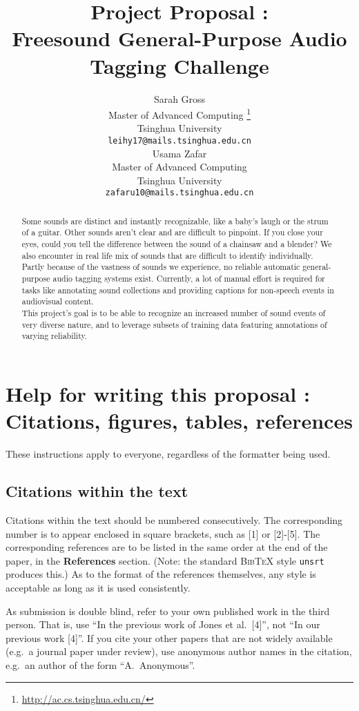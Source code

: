 \documentclass{article} %
\title{Project Proposal : \\Freesound General-Purpose Audio Tagging Challenge}
\author{
Sarah Gross \\
Master of Advanced Computing \thanks{\url{http://ac.cs.tsinghua.edu.cn/}}\\
Tsinghua University\\
\texttt{leihy17@mails.tsinghua.edu.cn} \\
\And
Usama Zafar\\
Master of Advanced Computing\\
Tsinghua University\\
\texttt{zafaru10@mails.tsinghua.edu.cn} \\
}
\begin{document}
\maketitle

\begin{abstract}
	Some sounds are distinct and instantly recognizable, like a baby's laugh or the strum of a guitar. Other sounds aren't clear and are difficult to pinpoint. 
	If you close your eyes, could you tell the difference between the sound of a chainsaw and a blender? We also encounter in real life mix of sounds that are difficult to identify individually.\\
	Partly because of the vastness of sounds we experience, no reliable automatic general-purpose audio tagging systems exist. Currently, a lot of manual effort is required for tasks like annotating sound collections and providing captions for non-speech events in audiovisual content.\\
	This project's goal is to be able to recognize an increased number of sound events of very diverse nature, and to leverage subsets of training data featuring annotations of varying reliability.
\end{abstract}

\section{Help for writing this proposal : Citations, figures, tables, references}
	\label{others}

	These instructions apply to everyone, regardless of the formatter being used.

	\subsection{Citations within the text}

	Citations within the text should be numbered consecutively. The corresponding
	number is to appear enclosed in square brackets, such as [1] or [2]-[5]. The
	corresponding references are to be listed in the same order at the end of the
	paper, in the \textbf{References} section. (Note: the standard
	\textsc{Bib\TeX} style \texttt{unsrt} produces this.) As to the format of the
	references themselves, any style is acceptable as long as it is used
	consistently.

	As submission is double blind, refer to your own published work in the 
	third person. That is, use ``In the previous work of Jones et al.\ [4]'',
	not ``In our previous work [4]''. If you cite your other papers that
	are not widely available (e.g.\ a journal paper under review), use
	anonymous author names in the citation, e.g.\ an author of the
	form ``A.\ Anonymous''. 
\end{document}
